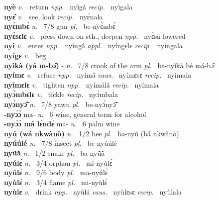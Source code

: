 {\bfseries nyè}  {\itshape v.~} return   {\itshape npp.~} nyìgá {\itshape recip.~} nyìgala  \\ 
{\bfseries nyɛ̂}  {\itshape v.~} see, look   {\itshape recip.~} nyɛ́nala  \\ 
{\bfseries nyɛ̀mbɛ́}  {\itshape n.~} 7/8 gun {\itshape pl.~} be-nyɛ̀mbɛ́    \\ 
{\bfseries nyɛ̀sɛlɛ}  {\itshape v.~} press down on sth., deepen   {\itshape npp.~} nyɛ̀sá lowered  \\ 
{\bfseries nyî}   {\itshape v.~} enter   {\itshape npp.~} nyíngâ {\itshape appl.~} nyíngɛlɛ {\itshape recip.~} nyíngala  \\ 
{\bfseries nyígɛ}  {\itshape v.~} beg    \\ 
{\bfseries nyìkà (yá m-bɔ̂)} - {\itshape n.~} 7/8 crook of the arm {\itshape pl.~} be-nyìkà bé má-bɔ̂    \\ 
{\bfseries nyímɛ}  {\itshape v.~} refuse   {\itshape npp.~} nyímâ {\itshape caus.~} nyímɛsɛ {\itshape recip.~} nyímala  \\ 
{\bfseries nyímɛlɛ}  {\itshape v.~} tighten   {\itshape npp.~} nyímálâ {\itshape recip.~} nyímala  \\ 
{\bfseries nyɔ̀mbɛlɛ}  {\itshape v.~} tickle   {\itshape recip.~} nyɔ̀mbala  \\ 
{\bfseries nyɔ́nyɔ̃̂}  {\itshape n.~} 7/8 yawn {\itshape pl.~} be-nyɔ́nyɔ̃̂    \\ 
{\bfseries -nyɔ́ɔ̀} ma- {\itshape n.~} 6 wine, general term for alcohol    \\ 
{\bfseries -nyɔ́ɔ̀ má lɛ́ndɛ́} ma- {\itshape  n.~} 6 palm wine    \\ 
{\bfseries nyú (wá nkwànò)}  {\itshape n.~} 1/2 bee {\itshape pl.~} ba-nyú (bá nkwànò)    \\ 
{\bfseries nyúúlé}  {\itshape n.~} 7/8 insect {\itshape pl.~} be-nyúúlé    \\ 
{\bfseries nyṹã̀}  {\itshape n.~} 1/2 snake {\itshape pl.~} ba-nyṹã̀    \\ 
{\bfseries nyúlɛ́}  {\itshape n.~} 3/4 orphan {\itshape pl.~} mi-nyúlɛ́    \\ 
{\bfseries nyúlɛ̀}  {\itshape n.~} 9/6 body {\itshape pl.~} ma-nyúlɛ̀    \\ 
{\bfseries nyùlɛ̀}  {\itshape n.~} 3/4 flame {\itshape pl.~} mi-nyùlɛ̀    \\ 
{\bfseries nyùlɛ}  {\itshape v.~} drink   {\itshape npp.~} nyùlá {\itshape caus.~} nyùlɛsɛ {\itshape recip.~} nyùlala  \\ 
